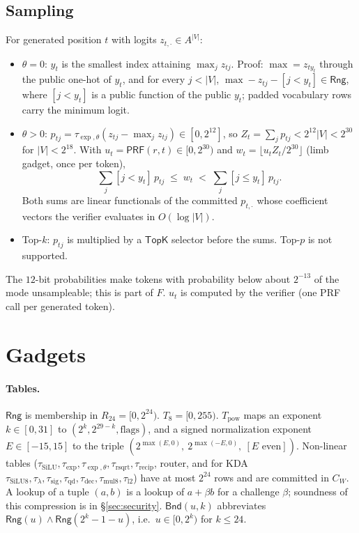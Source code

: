 \documentclass[11pt]{article}
\newcommand{\Rng}{\mathsf{Rng}}
\newcommand{\Bnd}{\mathsf{Bnd}}
\begin{document}
\subsection{Sampling}
\label{sec:sampling}

For generated position \(t\) with logits \(z_{t,\cdot} \in A^{|V|}\):
\begin{itemize}
\item \(\theta = 0\): \(y_t\) is the smallest index attaining \(\max_j z_{tj}\). Proof: \(\max = z_{t y_t}\) through the public one-hot of \(y_t\), and for every \(j < |V|\), \(\max - z_{tj} - [j < y_t] \in \Rng\), where \([j<y_t]\) is a public function of the public \(y_t\); padded vocabulary rows carry the minimum logit.
\item \(\theta > 0\): \(p_{tj} = \tau_{\exp,\theta}(z_{tj} - \max_j z_{tj}) \in [0, 2^{12}]\), so \(Z_t = \sum_j p_{tj} < 2^{12}|V| < 2^{30}\) for \(|V| < 2^{18}\).
With \(u_t = \mathsf{PRF}(r, t) \in [0, 2^{30})\) and \(w_t = \lfloor u_t Z_t / 2^{30}\rfloor\) (limb gadget, once per token),
\[
\textstyle\sum_j [j < y_t]\, p_{tj} \;\le\; w_t \;<\; \sum_j [j \le y_t]\, p_{tj}.
\]
Both sums are linear functionals of the committed \(p_{t,\cdot}\) whose coefficient vectors the verifier evaluates in \(O(\log|V|)\).
\item Top-\(k\): \(p_{tj}\) is multiplied by a \(\mathsf{TopK}\) selector before the sums. Top-\(p\) is not supported.
\end{itemize}
The \(12\)-bit probabilities make tokens with probability below about \(2^{-13}\) of the mode unsampleable; this is part of \(F\).
\(u_t\) is computed by the verifier (one PRF call per generated token).

\section{Gadgets}
\label{sec:gadgets}

\paragraph{Tables.}
\(\Rng\) is membership in \(R_{24} = [0, 2^{24})\).
\(T_8 = [0, 255)\).
\(T_{\mathrm{pow}}\) maps an exponent \(k \in [0, 31]\) to \((2^k, 2^{29-k}, \text{flags})\), and a signed normalization exponent \(E \in [-15, 15]\) to the triple \((2^{\max(E,0)},\ 2^{\max(-E,0)},\ [E \text{ even}])\).
Non-linear tables (\(\tau_{\mathrm{SiLU}}, \tau_{\exp}, \tau_{\exp,\theta}, \tau_{\mathrm{rsqrt}}, \tau_{\mathrm{recip}}\), router, and for KDA \(\tau_{\mathrm{SiLU8}}, \tau_\lambda, \tau_{\mathrm{sig}}, \tau_{\mathrm{qd}}, \tau_{\mathrm{dec}}, \tau_{\mathrm{mul8}}, \tau_{\mathrm{l2}}\)) have at most \(2^{24}\) rows and are committed in \(C_W\).
A lookup of a tuple \((a, b)\) is a lookup of \(a + \beta b\) for a challenge \(\beta\); soundness of this compression is in \S\ref{sec:security}.
\(\Bnd(u, k)\) abbreviates \(\Rng(u) \wedge \Rng(2^k - 1 - u)\), i.e.\ \(u \in [0, 2^k)\) for \(k \le 24\).
\end{document}
